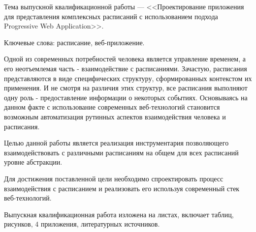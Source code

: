 
Тема выпускной квалификационной работы --- <<Проектирование приложения для представления комплексных расписаний с использованием подхода Progressive Web Application>>.

Ключевые слова: расписание, веб-приложение.

Одной из современных потребностей человека является управление временем, а его неотъемлемая часть - взаимодействие с расписаниями.
Зачастую, расписания представляются в виде специфических структуру, сформированных контекстом их применения.
И не смотря на различия этих структур, все расписания выполняют одну роль - предоставление информации о некоторых событиях.
Основываясь на данном факте с использование современных веб-технологий становится возможным автоматизация рутинных аспектов взаимодействия человека и расписания.

Целью данной работы является реализация инструментария позволяющего взаимодействовать с различными расписаниям на общем для всех расписаний уровне абстракции.

Для достижения поставленной цели необходимо спроектировать процесс взаимодействия с расписанием и реализовать его используя современный стек веб-технологий.

Выпускная квалификационная работа изложена на \pageref{LastPage} листах, включает  таблиц,  рисунков, 4 приложения,  литературных источников.

\clearpage